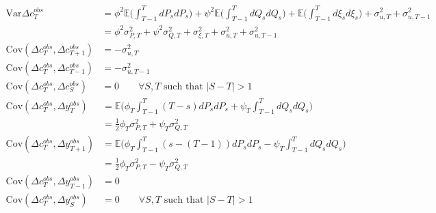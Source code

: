 \begin{align*}
\mathrm{Var}{\Delta c^{obs}_T} &= \phi^2 \mathbb{E}\Big( \int_{T-1}^{T} dP_s dP_s \Big) + \psi^2 \mathbb{E}\Big( \int_{T-1}^{T} dQ_s dQ_s \Big) + \mathbb{E} \Big( \int_{T-1}^{T} d\xi_s d\xi_s \Big) +  \sigma^2_{u,T} +  \sigma^2_{u,T-1} \nonumber \\
&= \phi^2 \sigma^2_{P,T} + \psi^2 \sigma^2_{Q,T} + \sigma^2_{\xi,T}+\sigma^2_{u,T}+   \sigma^2_{u,T-1}  \\
\mathrm{Cov}(\Delta c^{obs}_T, \Delta c_{T+1}^{obs}) &= -\sigma^2_{u,T} \\
\mathrm{Cov}(\Delta c^{obs}_T, \Delta c_{T-1}^{obs}) &= -\sigma^2_{u,T-1} \\
\mathrm{Cov}(\Delta c^{obs}_T, \Delta c_S^{obs}) &= 0 \qquad \forall S,T \text{ such that }|S-T| >1 
\end{align*}
\begin{align*}
\mathrm{Cov}(\Delta c^{obs}_T, \Delta y^{obs}_T) &=  \mathbb{E} \Big( \phi_T \int_{T-1}^{T} (T-s) dP_s dP_s + \psi_T \int_{T-1}^{T} dQ_s dQ_s \Big) \nonumber \\
&= \frac{1}{2} \phi_T \sigma^2_{P,T} + \psi_T \sigma^2_{Q,T} \\
\mathrm{Cov}(\Delta c^{obs}_T, \Delta y^{obs}_{T+1}) &=  \mathbb{E} \Big( \phi_T \int_{T-1}^{T} (s-(T-1)) dP_s dP_s - \psi_T \int_{T-1}^{T} dQ_s dQ_s \Big) \nonumber \\
&= \frac{1}{2} \phi_T \sigma^2_{P,T} - \psi_T \sigma^2_{Q,T} \\
\mathrm{Cov}(\Delta c^{obs}_T, \Delta y^{obs}_{T-1}) &= 0 \\
\mathrm{Cov}(\Delta c^{obs}_T, \Delta y^{obs}_{S}) &= 0 \qquad \forall S,T \text{ such that }|S-T| >1 
\end{align*}